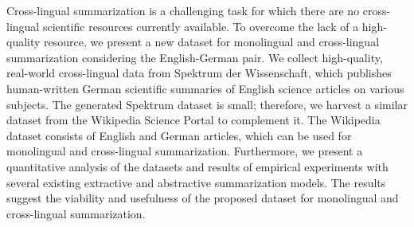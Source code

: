 Cross-lingual summarization is a challenging task for which there are no cross-lingual scientific resources currently available. To overcome the lack of a high-quality resource, we present a new dataset for monolingual and cross-lingual summarization considering the English-German pair. We collect high-quality, real-world cross-lingual data from Spektrum der Wissenschaft, which publishes human-written German scientific summaries of English science articles on various subjects. The generated Spektrum dataset is small; therefore, we harvest a similar dataset from the Wikipedia Science Portal to complement it. The Wikipedia dataset consists of English and German articles, which can be used for monolingual and cross-lingual summarization. Furthermore, we present a quantitative analysis of the datasets and results of empirical experiments with several existing extractive and abstractive summarization models. The results suggest the viability and usefulness of the proposed dataset for monolingual and cross-lingual summarization.
